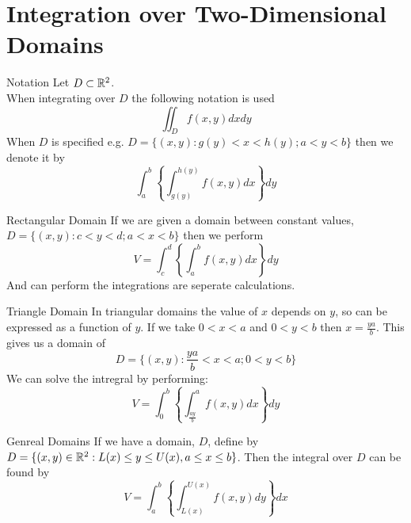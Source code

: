 \documentclass[11pt,a4paper]{article}
\begin{document}
\section{Integration over Two-Dimensional Domains}

\subtitle{Remark 12.1 - }{Notation}
Let $D \subset \mathbb{R}^2$.\\
When integrating over $D$ the following notation is used $$\iint_D f(x, y) dx dy$$
When $D$ is specified e.g. $D = \{(x, y) : g(y) < x < h(y); a < y < b\}$ then we denote it by $$\int_{a}^{b} \left\{\int_{g(y)}^{h(y)} f(x, y) dx \right\} dy$$

\subtitle{Theorem 12.2 - }{Rectangular Domain}
If we are given a domain between constant values, $D = \{(x, y) : c < y < d; a < x < b\}$ then we perform
$$V = \int_{c}^{d} \left\{\int_{a}^{b} f(x, y) dx \right\} dy$$
And can perform the integrations are seperate calculations.

\subtitle{Theorem 12.3 - }{Triangle Domain}
In triangular domains the value of $x$ depends on $y$, so can be expressed as a function of $y$. If we take $0 < x < a$ and $0 < y < b$ then $x = \frac{ya}{b}$.
This gives us a domain of $$D = \{(x, y): \frac{ya}{b} < x < a; 0 < y < b\}$$
We can solve the intregral by performing: $$V = \int_{0}^{b} \left\{ \int_{\frac{ay}{b}}^{a} f(x, y) dx \right\} dy$$

\subtitle{Theorem 12.4 - }{Genreal Domains}
If we have a domain, $D$, define by $D = \{(x, y) \in \mathbb{R}^2: L(x) \leq y \leq U(x), a \leq x \leq b\}$. Then the integral over $D$ can be found by
$$V=\int_{a}^{b} \left\{ \int_{L(x)}^{U(x)} f(x,y) dy \right\} dx$$
\end{document}
